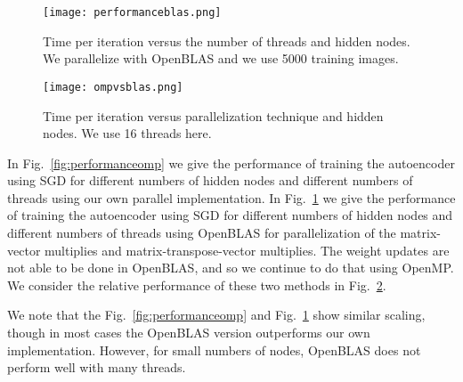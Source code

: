 \begin{figure}[h]
\centering
\texttt{[image: performanceblas.png]}
\caption{Time per iteration versus the number of threads and hidden nodes. We parallelize with OpenBLAS and we use 5000 training images.}
\label{fig:performanceblas}
\end{figure}



\begin{figure}[h]
\centering
\texttt{[image: ompvsblas.png]}
\caption{Time per iteration versus parallelization technique and hidden nodes. We use 16 threads here.}
\label{fig:ompvsblas}
\end{figure}

In  Fig.~\ref{fig:performanceomp} we give the performance of training the autoencoder using SGD for different numbers of hidden nodes and different numbers of threads using our own parallel implementation.
In  Fig.~\ref{fig:performanceblas} we give the performance of training the autoencoder using SGD for different numbers of hidden nodes and different numbers of threads using OpenBLAS for parallelization of the matrix-vector multiplies and
matrix-transpose-vector multiplies. The weight updates are not able to be done in OpenBLAS, and so we continue to do that using OpenMP.
We consider the relative performance of these two methods in Fig.~\ref{fig:ompvsblas}.

We note that the Fig.~\ref{fig:performanceomp} and Fig.~\ref{fig:performanceblas} show similar scaling, though in most cases the OpenBLAS version outperforms our own implementation. However, for small numbers of nodes, OpenBLAS does not perform well with many threads.
